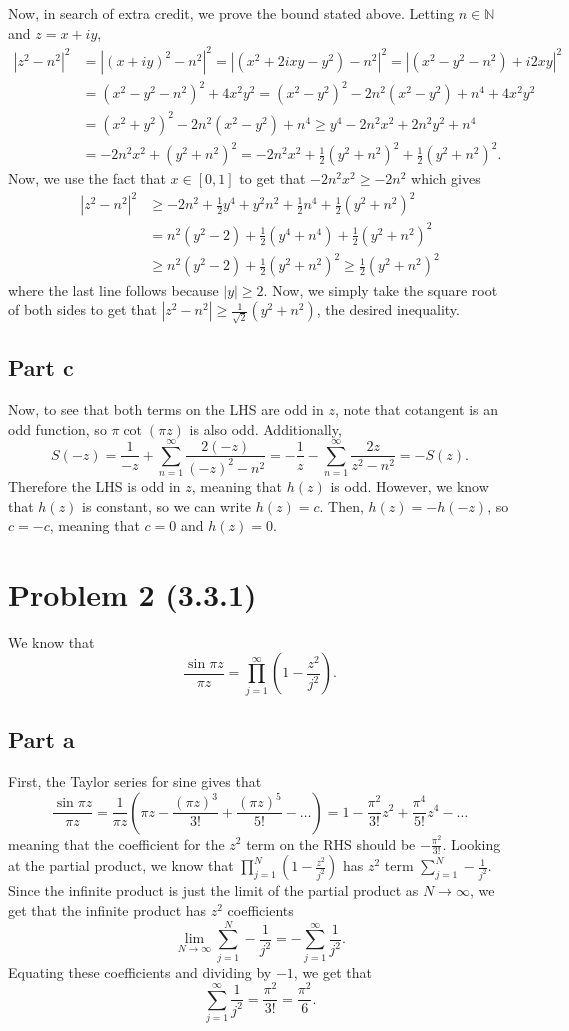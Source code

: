 \documentclass{article}
\begin{document}
Now, in search of extra credit, we prove the bound stated above.
Letting $n\in\mathbb{N}$ and $z=x+iy$, 
\begin{align*}
|z^2-n^2|^2&=|(x+iy)^2-n^2|^2=|(x^2+2ixy-y^2)-n^2|^2=|(x^2-y^2-n^2)+i2xy|^2\\&=
(x^2-y^2-n^2)^2+4x^2y^2=(x^2-y^2)^2-2n^2(x^2-y^2)+n^4+4x^2y^2\\&=
(x^2+y^2)^2-2n^2(x^2-y^2)+n^4\geq y^4-2n^2x^2+2n^2y^2+n^4\\&=
-2n^2x^2+(y^2+n^2)^2=-2n^2x^2+\frac{1}{2}(y^2+n^2)^2+\frac{1}{2}(y^2+n^2)^2.
\end{align*}
Now, we use the fact that $x\in[0,1]$ to get that $-2n^2x^2\geq-2n^2$ which gives
\begin{align*}
|z^2-n^2|^2&\geq-2n^2+\frac{1}{2}y^4+y^2n^2+\frac{1}{2}n^4+\frac{1}{2}(y^2+n^2)^2\\&=
n^2(y^2-2)+\frac{1}{2}(y^4+n^4)+\frac{1}{2}(y^2+n^2)^2\\&\geq
n^2(y^2-2)+\frac{1}{2}(y^2+n^2)^2\geq\frac{1}{2}(y^2+n^2)^2
\end{align*}
where the last line follows because $|y|\geq2$. Now, we simply take the square root of both sides to get that $|z^2-n^2|\geq\frac{1}{\sqrt{2}}(y^2+n^2)$, the desired inequality.  

\subsection{Part c}
Now, to see that both terms on the LHS are odd in $z$, note that cotangent is an odd function, so $\pi\cot(\pi z)$ is also odd. Additionally, 
\[
S(-z)=\frac{1}{-z}+\sum_{n=1}^\infty \frac{2(-z)}{(-z)^2 - n^2}=-\frac{1}{z}-\sum_{n=1}^\infty \frac{2z}{z^2 - n^2}=-S(z).
\]
Therefore the LHS is odd in $z$, meaning that $h(z)$ is odd. However, we know that $h(z)$ is constant, so we can write $h(z)=c$. Then, $h(z)=-h(-z)$, so $c=-c$, meaning that $c=0$ and $h(z)=0$.

\section{Problem 2 (3.3.1)} 
We know that 
\[
\frac{\sin \pi z}{\pi z}=\prod_{j=1}^\infty
\left(1-\frac{z^2}{j^2}\right).
\]
\subsection{Part a}
First, the Taylor series for sine gives that 
\[
\frac{\sin \pi z}{\pi z}=\frac{1}{\pi z}\left(\pi z-\frac{(\pi z)^3}{3!}+\frac{(\pi z)^5}{5!}-\ldots\right)=1-\frac{\pi^2}{3!}z^2+\frac{\pi^4}{5!}z^4-\dots
\]
meaning that the coefficient for the $z^2$ term on the RHS should be $-\frac{\pi^2}{3!}$. Looking at the partial product, we know that $\prod_{j=1}^N
\left(1-\frac{z^2}{j^2}\right)$ has $z^2$ term $\sum_{j=1}^N-\frac{1}{j^2}$. Since the infinite product is just the limit of the partial product as $N\to\infty$, we get that the infinite product has $z^2$ coefficients 
\[
\lim_{N\to\infty}\sum_{j=1}^N-\frac{1}{j^2}=-\sum_{j=1}^\infty\frac{1}{j^2}.
\]
Equating these coefficients and dividing by $-1$, we get that 
\[
\sum_{j=1}^\infty\frac{1}{j^2}=\frac{\pi^2}{3!}=\frac{\pi^2}{6}.
\]
\end{document}
